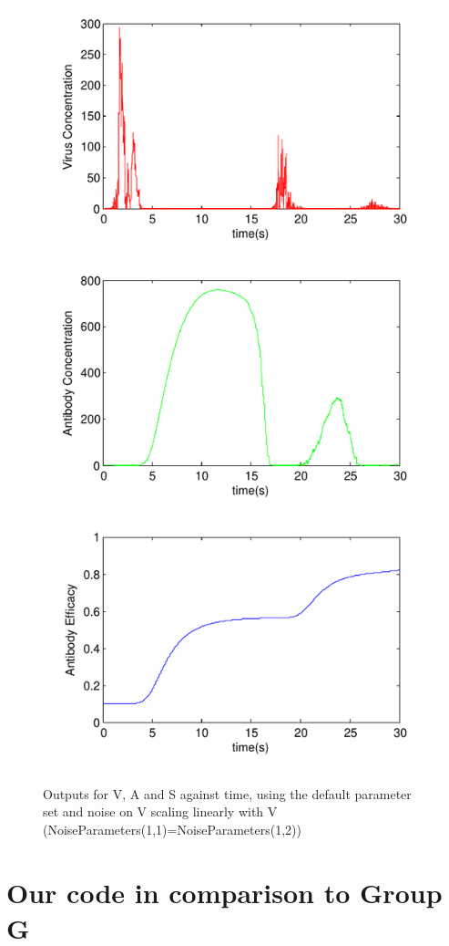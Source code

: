 \documentclass[a4paper, 12pt]{report}
\begin{document}
\begin{figure}
\begin{center}
\includegraphics[width=120mm]{Resurgance_scissored.pdf}
\label{resurgance}
\caption{Outputs for V, A and S against time, using the default parameter set and noise on V scaling linearly with V (NoiseParameters(1,1)=NoiseParameters(1,2))}
\end{center}
\end{figure}



\chapter{Our code in comparison to Group G}



\end{document}
